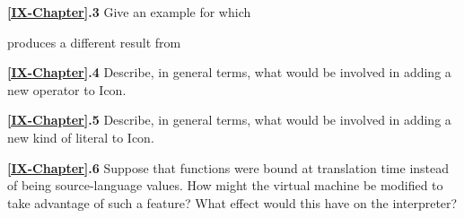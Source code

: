 \noindent\textbf{\ref*{IX-Chapter}.3}
Give an example for which


produces a different result from


\noindent\textbf{\ref*{IX-Chapter}.4}
Describe, in general terms, what would be involved in adding a
new operator to Icon.

\noindent\textbf{\ref*{IX-Chapter}.5}
Describe, in general terms, what would be involved in adding a
new kind of literal to Icon.

\noindent\textbf{\ref*{IX-Chapter}.6}
Suppose that functions were bound at translation time instead of
being source-language values. How might the virtual machine be
modified to take advantage of such a feature?  What effect would this
have on the interpreter?

